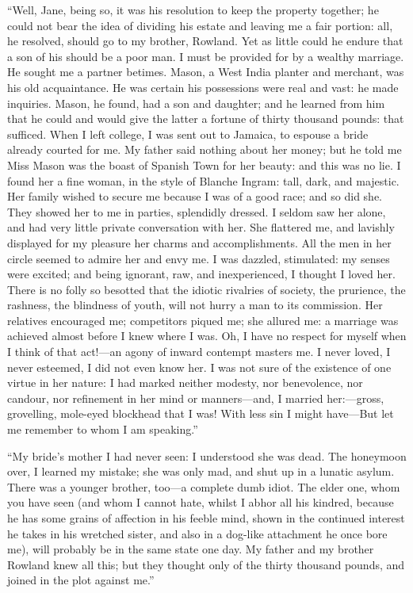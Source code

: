 \enquote{Well, Jane, being so, it was his resolution to keep the
property together; he could not bear the idea of dividing his estate and
leaving me a fair portion: all, he resolved, should go to my brother,
Rowland. Yet as little could he endure that a son of his should be a
poor man. I must be provided for by a wealthy marriage. He sought me a
partner betimes. \Mr{} Mason, a West India planter and merchant, was his
old acquaintance. He was certain his possessions were real and vast: he
made inquiries. \Mr{} Mason, he found, had a son and daughter; and he
learned from him that he could and would give the latter a fortune of
thirty thousand pounds: that sufficed. When I left college, I was sent
out to Jamaica, to espouse a bride already courted for me. My father
said nothing about her money; but he told me Miss Mason was the boast of
Spanish Town for her beauty: and this was no lie. I found her a fine
woman, in the style of Blanche Ingram: tall, dark, and majestic. Her
family wished to secure me because I was of a good race; and so did
she. They showed her to me in parties, splendidly dressed. I seldom
saw her alone, and had very little private conversation with her. She
flattered me, and lavishly displayed for my pleasure her charms and
accomplishments. All the men in her circle seemed to admire her and
envy me. I was dazzled, stimulated: my senses were excited; and being
ignorant, raw, and inexperienced, I thought I loved her. There is no
folly so besotted that the idiotic rivalries of society, the prurience,
the rashness, the blindness of youth, will not hurry a man to its
commission. Her relatives encouraged me; competitors piqued me; she
allured me: a marriage was achieved almost before I knew where I was. 
Oh, I have no respect for myself when I think of that act!---an agony of
inward contempt masters me. I never loved, I never esteemed, I did not
even know her. I was not sure of the existence of one virtue in her
nature: I had marked neither modesty, nor benevolence, nor candour, nor
refinement in her mind or manners---and, I married her:---gross,
grovelling, mole-eyed blockhead that I was! With less sin I might
have---But let me remember to whom I am speaking.}

\enquote{My bride's mother I had never seen: I understood she was dead. 
The honeymoon over, I learned my mistake; she was only mad, and shut up
in a lunatic asylum. There was a younger brother, too---a complete dumb
idiot. The elder one, whom you have seen (and whom I cannot hate,
whilst I abhor all his kindred, because he has some grains of affection
in his feeble mind, shown in the continued interest he takes in his
wretched sister, and also in a dog-like attachment he once bore me),
will probably be in the same state one day. My father and my brother
Rowland knew all this; but they thought only of the thirty thousand
pounds, and joined in the plot against me.}

